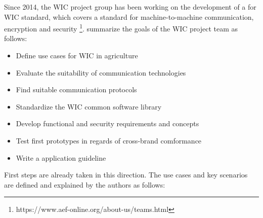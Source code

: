 Since 2014, the \ac{WIC} project group has been working on the development of a  for \ac{WIC} standard, which covers a standard for machine-to-machine communication, encryption and security \footnote{https://www.aef-online.org/about-us/teams.html}.
\textcite{schlingmann2019AEFusecases} summarize the goals of the \ac{WIC} project team as follows:
\begin{itemize}
	\item Define use cases for \ac{WIC} in agriculture
	\item Evaluate the suitability of communication technologies
	\item Find suitable communication protocols
	\item Standardize the \ac{WIC} common software library
	\item Develop functional and security requirements and concepts
	\item Test first prototypes in regards of cross-brand comformance
	\item Write a application guideline
\end{itemize}
First steps are already taken in this direction. The use cases and key scenarios are defined and explained by the authors as follows:
